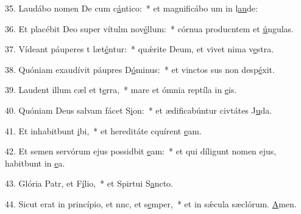 35. Laudábo nomen De cum c\uline{á}ntico:~* et magnificábo um in l\uline{au}de:\par 
36. Et placébit Deo super vítulm nov\uline{é}llum:~* córnua producntem et \uline{ú}ngulas.\par 
37. Vídeant páuperes t læt\uline{é}ntur:~* quǽrite Deum, et vivet nima v\uline{e}stra.\par 
38. Quóniam exaudívit páupres D\uline{ó}minus:~* et vinctos sus non desp\uline{é}xit.\par 
39. Laudent illum cæl et t\uline{e}rra,~* mare et ómnia reptíla in \uline{e}is.\par 
40. Quóniam Deus salvam fácet S\uline{i}on:~* et ædificabúntur civtátes J\uline{u}da.\par 
41. Et inhabitbunt \uline{i}bi,~* et hereditáte cquírent \uline{e}am.\par 
42. Et semen servórum ejus possidbit \uline{e}am:~* et qui díligunt nomen ejus, habitbunt in \uline{e}a.\par 
43. Glória Patr, et F\uline{í}lio,~* et Spirtui S\uline{a}ncto.\par 
44. Sicut erat in princípio, et nnc, et s\uline{e}mper,~* et in sǽcula sæclórum. \uline{A}men.\par 
